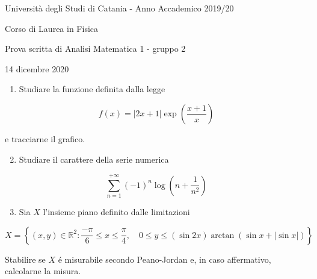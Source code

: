 \documentclass[10pt]{article}
\begin{document}
Università degli Studi di Catania - Anno Accademico 2019/20

Corso di Laurea in Fisica

Prova scritta di Analisi Matematica 1 - gruppo 2

14 dicembre 2020

\begin{enumerate}
  \item Studiare la funzione definita dalla legge
\end{enumerate}

\[
f(x)=|2 x+1| \exp \left(\frac{x+1}{x}\right)
\]

e tracciarne il grafico.

\begin{enumerate}
  \setcounter{enumi}{1}
  \item Studiare il carattere della serie numerica
\end{enumerate}

\[
\sum_{n=1}^{+\infty}(-1)^{n} \log \left(n+\frac{1}{n^{2}}\right)
\]

\begin{enumerate}
  \setcounter{enumi}{2}
  \item Sia \(X\) l'insieme piano definito dalle limitazioni
\end{enumerate}

\[
X=\left\{(x, y) \in \mathbb{R}^{2}: \frac{-\pi}{6} \leq x \leq \frac{\pi}{4}, \quad 0 \leq y \leq(\sin 2 x) \arctan (\sin x+|\sin x|)\right\}
\]

Stabilire se \(X\) é misurabile secondo Peano-Jordan e, in caso affermativo, calcolarne la misura.
\end{document}
